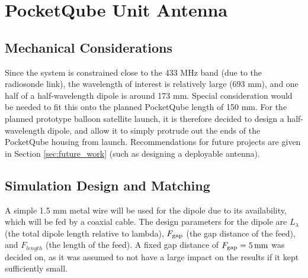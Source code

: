 \graphicspath{{./figures}}

\section{PocketQube Unit Antenna}
\subsection{Mechanical Considerations}
Since the system is constrained close to the 433 MHz band (due to the radiosonde link), the wavelength of interest is relatively large (693 mm), and one half of a half-wavelength dipole is around 173 mm. Special consideration would be needed to fit this onto the planned PocketQube length of 150 mm. For the planned prototype balloon satellite launch, it is therefore decided to design a half-wavelength dipole, and allow it to simply protrude out the ends of the PocketQube housing from launch. Recommendations for future projects are given in Section \ref{sec:future_work} (such as designing a deployable antenna).

\subsection{Simulation Design and Matching}
A simple 1.5 mm metal wire will be used for the dipole due to its availability, which will be fed by a coaxial cable. The design parameters for the dipole are $L_\lambda$ (the total dipole length relative to lambda), $F_{\textnormal{gap}}$ (the gap distance of the feed), and $F_{length}$ (the length of the feed). A fixed gap distance of $F_{\textnormal{gap}} = \SI{5}{mm}$ was decided on, as it was assumed to not have a large impact on the results if it kept sufficiently small.

